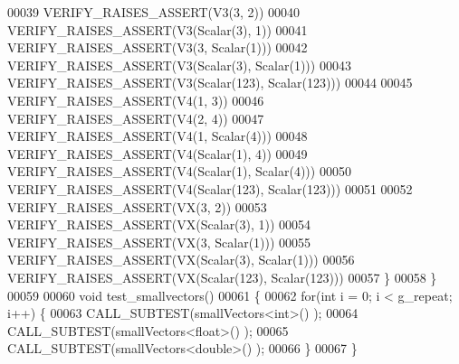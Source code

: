\begin{DoxyCode}
00039     VERIFY\_RAISES\_ASSERT(V3(3, 2))
00040     VERIFY\_RAISES\_ASSERT(V3(Scalar(3), 1))
00041     VERIFY\_RAISES\_ASSERT(V3(3, Scalar(1)))
00042     VERIFY\_RAISES\_ASSERT(V3(Scalar(3), Scalar(1)))
00043     VERIFY\_RAISES\_ASSERT(V3(Scalar(123), Scalar(123)))
00044 
00045     VERIFY\_RAISES\_ASSERT(V4(1, 3))
00046     VERIFY\_RAISES\_ASSERT(V4(2, 4))
00047     VERIFY\_RAISES\_ASSERT(V4(1, Scalar(4)))
00048     VERIFY\_RAISES\_ASSERT(V4(Scalar(1), 4))
00049     VERIFY\_RAISES\_ASSERT(V4(Scalar(1), Scalar(4)))
00050     VERIFY\_RAISES\_ASSERT(V4(Scalar(123), Scalar(123)))
00051 
00052     VERIFY\_RAISES\_ASSERT(VX(3, 2))
00053     VERIFY\_RAISES\_ASSERT(VX(Scalar(3), 1))
00054     VERIFY\_RAISES\_ASSERT(VX(3, Scalar(1)))
00055     VERIFY\_RAISES\_ASSERT(VX(Scalar(3), Scalar(1)))
00056     VERIFY\_RAISES\_ASSERT(VX(Scalar(123), Scalar(123)))
00057   \}
00058 \}
00059 
00060 \textcolor{keywordtype}{void} test\_smallvectors()
00061 \{
00062   \textcolor{keywordflow}{for}(\textcolor{keywordtype}{int} i = 0; i < g\_repeat; i++) \{
00063     CALL\_SUBTEST(smallVectors<int>() );
00064     CALL\_SUBTEST(smallVectors<float>() );
00065     CALL\_SUBTEST(smallVectors<double>() );
00066   \}
00067 \}
\end{DoxyCode}
